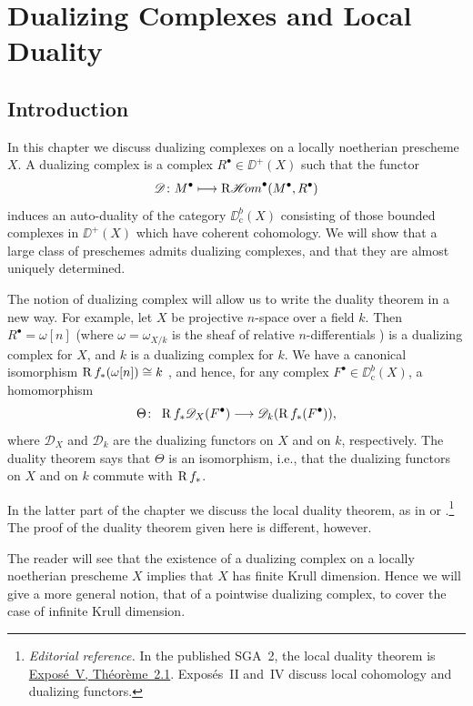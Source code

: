 
\chapter{Dualizing Complexes and Local Duality}
\setcounter{section}{-1}

\section{Introduction}\label{sec:5.0}

In this chapter we discuss dualizing complexes on a locally noetherian prescheme $X$. A dualizing complex is a complex $R^\bullet\in\DD^+(X)$ such that the functor
\[
\mathscr{D}\colon M^{\bullet}\longmapsto \mathop{\mathrm{R}\mathscr{H}\!om}\nolimits^\bullet(M^{\bullet},R^{\bullet})
\]
induces an auto-duality of the category $\DD_{\mathrm{c}}^{b}(X)$ consisting of those bounded complexes in $\DD^+(X)$ which have coherent cohomology. We will show that a large class of preschemes admits dualizing complexes, and that they are almost uniquely determined.

The notion of dualizing complex will allow us to write the duality theorem in a new way. For example, let $X$ be projective $n$-space over a field $k$. Then $R^\bullet=\omega[n]$ (where $\omega=\omega_{X/k}$ is the sheaf of relative $n$-differentials ) is a dualizing complex for $X$, and $k$ is a dualizing complex for $k$. We have a canonical isomorphism $\operatorname{R} f_*(\omega[n])\cong k$ , and hence, for any complex $F^\bullet\in\DD^b_{\mathrm{c}}(X)$, a homomorphism
\[
\Theta\colon\ \operatorname{R} f_* \mathscr{D}_X(F^\bullet)\longrightarrow \mathscr{D}_k(\operatorname{R} f_*(F^\bullet)),
\]
where $\mathscr{D}_X$ and $\mathscr{D}_k$ are the dualizing functors on $X$ and on $k$, respectively. The duality theorem  says that $\Theta$ is an isomorphism, i.e., that the dualizing functors on $X$ and on $k$ commute with $\operatorname{R} f_*$.

In the latter part of the chapter we discuss the local duality theorem, as in \mbox{\cite[\nopp \S\S2,4,6]{LC}} or \cite[, expos\'es~2,4]{SGA}.\footnote{\emph{Editorial reference.} In the published SGA~2, the local duality theorem is \href{https://arxiv.org/pdf/math/0511279\#page=58}{Expos\'e~V, Th\'eor\`eme~2.1}. Expos\'es~II and~IV discuss local cohomology and dualizing functors.} The proof of the duality theorem given here is different, however.

The reader will see that the existence of a dualizing complex on a locally noetherian prescheme $X$ implies that $X$ has finite Krull dimension. Hence we will give a more general notion, that of a pointwise dualizing complex, to cover the case of infinite Krull dimension.

